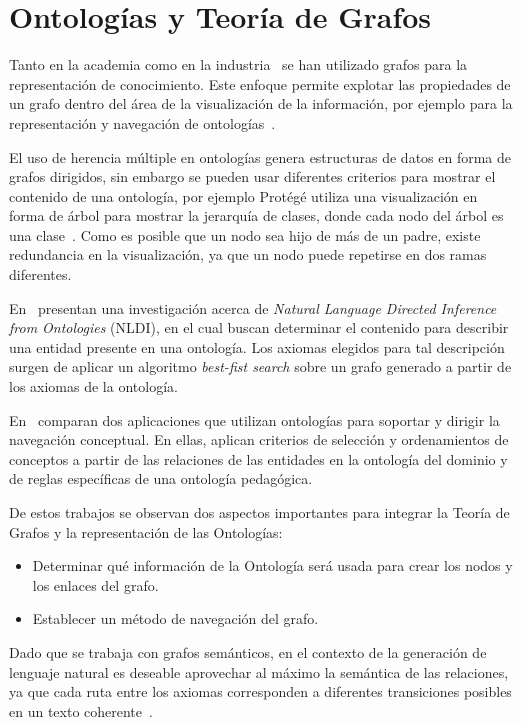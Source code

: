 \section{Ontologías y Teoría de Grafos}
Tanto en la academia como en la industria~\cite{soylu2018navigating} se han utilizado grafos para la representación de conocimiento. Este enfoque permite explotar las propiedades de un grafo dentro del área de la visualización de la información, por ejemplo para la representación y navegación de ontologías~\cite{escarza2005visualizacion}.

El uso de herencia múltiple en ontologías genera estructuras de datos en forma de grafos dirigidos, sin embargo se pueden usar diferentes criterios para mostrar el contenido de una ontología, por ejemplo Protégé utiliza una visualización en forma de árbol para mostrar la jerarquía de clases, donde cada nodo del árbol es una clase~\cite{protegehierarchy}. Como es posible que un nodo sea hijo de más de un padre, existe redundancia en la visualización, ya que un nodo puede repetirse en dos ramas diferentes.

En~\cite{mellish2008natural} presentan una investigación acerca de \emph{Natural Language Directed Inference from Ontologies} (NLDI), en el cual buscan determinar el contenido para describir una entidad presente en una ontología. Los axiomas elegidos para tal descripción surgen de aplicar un algoritmo \emph{best-fist search} sobre un grafo generado a partir de los axiomas de la ontología.

En~\cite{crampes2007ontology} comparan dos aplicaciones que utilizan ontologías para soportar y dirigir la navegación conceptual. En ellas, aplican criterios de selección y ordenamientos de conceptos a partir de las relaciones de las entidades en la ontología del dominio y de reglas específicas de una ontología pedagógica. 

De estos trabajos se observan dos aspectos importantes para integrar la Teoría de Grafos y la representación de las Ontologías:
\begin{itemize}
    \item Determinar qué información de la Ontología será usada para crear los nodos y los enlaces del grafo.
    \item Establecer un método de navegación del grafo.
\end{itemize}

Dado que se trabaja con grafos semánticos, en el contexto de la generación de lenguaje natural es deseable aprovechar al máximo la semántica de las relaciones, ya que cada ruta entre los axiomas corresponden a diferentes transiciones posibles en un texto coherente~\cite{mellish2008natural}.


